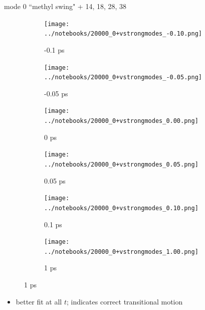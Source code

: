 \documentclass{beamer}
\begin{document}
\begin{frame}{mode 0 ``methyl swing" + 14, 18, 28, 38}
	\begin{figure}
		\centering
		\begin{subfigure}[b]{\w\textwidth}
			\centering
			\texttt{[image: ../notebooks/20000\_0+vstrongmodes\_-0.10.png]}
			\caption{-0.1 ps}
		\end{subfigure}
		\begin{subfigure}[b]{\w\textwidth}
			\centering
			\texttt{[image: ../notebooks/20000\_0+vstrongmodes\_-0.05.png]}
			\caption{-0.05 ps}
		\end{subfigure}
		\begin{subfigure}[b]{\w\textwidth}
			\centering
			\texttt{[image: ../notebooks/20000\_0+vstrongmodes\_0.00.png]}
			\caption{0 ps}
		\end{subfigure}
		\begin{subfigure}[b]{\w\textwidth}
			\centering
			\texttt{[image: ../notebooks/20000\_0+vstrongmodes\_0.05.png]}
			\caption{0.05 ps}
		\end{subfigure}
		\begin{subfigure}[b]{\w\textwidth}
			\centering
			\texttt{[image: ../notebooks/20000\_0+vstrongmodes\_0.10.png]}
			\caption{0.1 ps}
		\end{subfigure}
		\begin{subfigure}[b]{\w\textwidth}
			\centering
			\texttt{[image: ../notebooks/20000\_0+vstrongmodes\_1.00.png]}
			\caption{1 ps}
		\end{subfigure}
	\end{figure}
\begin{itemize}
	\item better fit at all $t$; indicates correct transitional motion
\end{itemize}
\end{frame}
\end{document}
